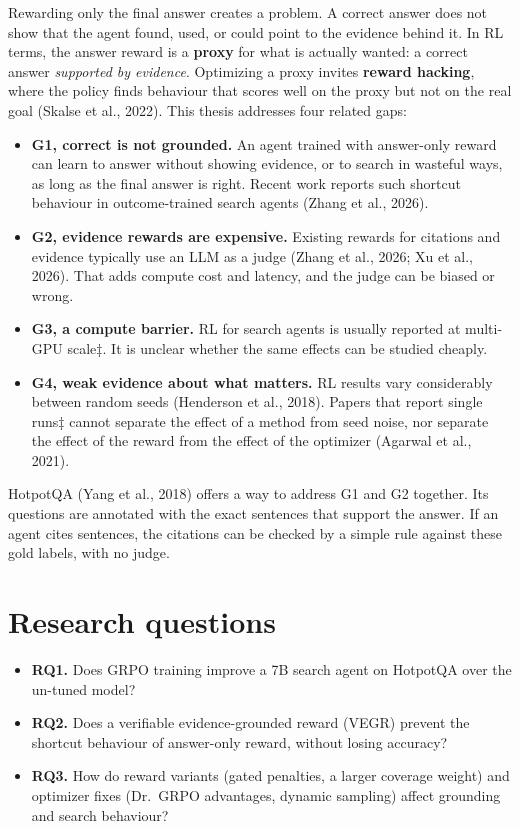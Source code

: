 Rewarding only the final answer creates a problem. A correct answer does
not show that the agent found, used, or could point to the evidence
behind it. In RL terms, the answer reward is a \textbf{proxy} for what
is actually wanted: a correct answer \emph{supported by evidence}.
Optimizing a proxy invites \textbf{reward hacking}, where the policy
finds behaviour that scores well on the proxy but not on the real goal
(Skalse et al., 2022). This thesis addresses four related gaps:

\begin{itemize}
\tightlist
\item
  \textbf{G1, correct is not grounded.} An agent trained with
  answer-only reward can learn to answer without showing evidence, or to
  search in wasteful ways, as long as the final answer is right. Recent
  work reports such shortcut behaviour in outcome-trained search agents
  (Zhang et al., 2026).
\item
  \textbf{G2, evidence rewards are expensive.} Existing rewards for
  citations and evidence typically use an LLM as a judge (Zhang et al.,
  2026; Xu et al., 2026). That adds compute cost and latency, and the
  judge can be biased or wrong.
\item
  \textbf{G3, a compute barrier.} RL for search agents is usually
  reported at multi-GPU scale‡. It is unclear whether the same effects
  can be studied cheaply.
\item
  \textbf{G4, weak evidence about what matters.} RL results vary
  considerably between random seeds (Henderson et al., 2018). Papers
  that report single runs‡ cannot separate the effect of a method from
  seed noise, nor separate the effect of the reward from the effect of
  the optimizer (Agarwal et al., 2021).
\end{itemize}

HotpotQA (Yang et al., 2018) offers a way to address G1 and G2 together.
Its questions are annotated with the exact sentences that support the
answer. If an agent cites sentences, the citations can be checked by a
simple rule against these gold labels, with no judge.

\section{Research questions}\label{sec:1.3}

\begin{itemize}
\tightlist
\item
  \textbf{RQ1.} Does GRPO training improve a 7B search agent on HotpotQA
  over the un-tuned model?
\item
  \textbf{RQ2.} Does a verifiable evidence-grounded reward (VEGR)
  prevent the shortcut behaviour of answer-only reward, without losing
  accuracy?
\item
  \textbf{RQ3.} How do reward variants (gated penalties, a larger
  coverage weight) and optimizer fixes (Dr.~GRPO advantages, dynamic
  sampling) affect grounding and search behaviour?
\end{itemize}

